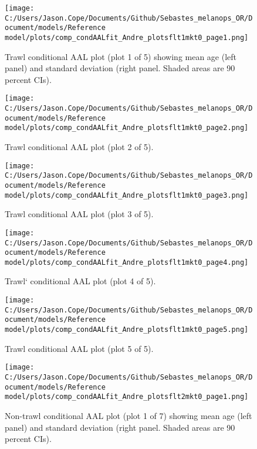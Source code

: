 \documentclass[11pt,
  english,
  letterpaper,
]{article}
\begin{document}
\begin{figure}
\centering
\texttt{[image: C:/Users/Jason.Cope/Documents/Github/Sebastes\_melanops\_OR/Document/models/Reference model/plots/comp\_condAALfit\_Andre\_plotsflt1mkt0\_page1.png]}
\caption{Trawl conditional AAL plot (plot 1 of 5) showing mean age (left panel) and standard deviation (right panel. Shaded areas are 90 percent CIs).\label{fig:comp_condAALfit_Andre_plotsflt1mkt0_page1}}
\end{figure}

\begin{figure}
\centering
\texttt{[image: C:/Users/Jason.Cope/Documents/Github/Sebastes\_melanops\_OR/Document/models/Reference model/plots/comp\_condAALfit\_Andre\_plotsflt1mkt0\_page2.png]}
\caption{Trawl conditional AAL plot (plot 2 of 5).\label{fig:comp_condAALfit_Andre_plotsflt1mkt0_page2}}
\end{figure}

\begin{figure}
\centering
\texttt{[image: C:/Users/Jason.Cope/Documents/Github/Sebastes\_melanops\_OR/Document/models/Reference model/plots/comp\_condAALfit\_Andre\_plotsflt1mkt0\_page3.png]}
\caption{Trawl conditional AAL plot (plot 3 of 5).\label{fig:comp_condAALfit_Andre_plotsflt1mkt0_page3}}
\end{figure}

\begin{figure}
\centering
\texttt{[image: C:/Users/Jason.Cope/Documents/Github/Sebastes\_melanops\_OR/Document/models/Reference model/plots/comp\_condAALfit\_Andre\_plotsflt1mkt0\_page4.png]}
\caption{Trawl` conditional AAL plot (plot 4 of 5).\label{fig:comp_condAALfit_Andre_plotsflt1mkt0_page4}}
\end{figure}

\begin{figure}
\centering
\texttt{[image: C:/Users/Jason.Cope/Documents/Github/Sebastes\_melanops\_OR/Document/models/Reference model/plots/comp\_condAALfit\_Andre\_plotsflt1mkt0\_page5.png]}
\caption{Trawl conditional AAL plot (plot 5 of 5).\label{fig:comp_condAALfit_Andre_plotsflt1mkt0_page5}}
\end{figure}

\begin{figure}
\centering
\texttt{[image: C:/Users/Jason.Cope/Documents/Github/Sebastes\_melanops\_OR/Document/models/Reference model/plots/comp\_condAALfit\_Andre\_plotsflt2mkt0\_page1.png]}
\caption{Non-trawl conditional AAL plot (plot 1 of 7) showing mean age (left panel) and standard deviation (right panel. Shaded areas are 90 percent CIs).\label{fig:comp_condAALfit_Andre_plotsflt2mkt0_page1}}
\end{figure}
\end{document}
